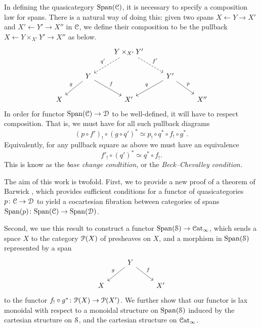 \documentclass[main.tex]{subfiles}
\begin{document}
In defining the quasicategory $\Span(\category{C})$, it is necessary to specify a composition law for spans. There is a natural way of doing this: given two spans $X \leftarrow Y \rightarrow X'$ and $X' \leftarrow Y' \rightarrow X''$ in $\category{C}$, we define their composition to be the pullback $X \leftarrow Y \times_{X'} Y' \rightarrow X''$ as below.
\begin{equation*}
  \begin{tikzcd}
    && Y \times_{X'} Y'
    \arrow[dl, dashed, swap, "q'"]
    \arrow[dr, dashed, "f'"]
    \\
    & Y
    \arrow[dl, swap, "g"]
    \arrow[dr, "f"]
    && Y'
    \arrow[dl, swap, "q"]
    \arrow[dr, "p"]
    \\
    X
    && X'
    && X''
  \end{tikzcd}
\end{equation*}
In order for functor $\Span(\category{C}) \to \category{D}$ to be well-defined, it will have to respect composition. That is, we must have for all such pullback diagrams
\begin{equation*}
  (p \circ f')_{!} \circ (g \circ q')^{*} \simeq p_{!} \circ q^{*} \circ f_{!} \circ g^{*}.
\end{equation*}
Equivalently, for any pullback square as above we must have an equivalence
\begin{equation*}
  f'_{!} \circ (q')^{*} \simeq q^{*} \circ f_{!}.
\end{equation*}
This is know as the \emph{base change condtition,} or the \emph{Beck--Chevalley condition.}

The aim of this work is twofold. First, we to provide a new proof of a theorem of Barwick \cite[Thm. 12.2]{spectralmackeyfunctors1}, which provides sufficient conditions for a functor of quasicategories $p\colon \category{C} \to \category{D}$ to yield a cocartesian fibration between categories of spans $\Span(p)\colon \Span(\category{C}) \to \Span(\category{D})$. %

Second, we use this result to construct a functor $\Span(\category{S}) \to \ICat$, which sends a space $X$ to the category $\P(X)$ of presheaves on $X$, and a morphism in $\Span(\S)$ represented by a span
\begin{equation*}
  \begin{tikzcd}
    & Y
    \arrow[dl, swap, "g"]
    \arrow[dr, "f"]
    \\
    X
    && X'
  \end{tikzcd}
\end{equation*}
to the functor $f_{!} \circ g^{*}\colon \P(X) \to \P(X')$. We further show that our functor is lax monoidal with respect to a monoidal structure on $\Span(\S)$ induced by the cartesian structure on $\S$, and the cartesian structure on $\ICat$.
\end{document}

